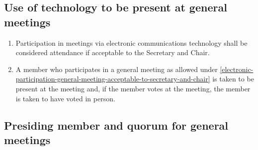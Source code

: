 \documentclass[../constitution.tex]{subfiles}
\begin{document}
\hypertarget{use-of-technology-to-be-present-at-general-meetings}{%
\subsection{Use of technology to be present at general meetings}\label{use-of-technology-to-be-present-at-general-meetings}}

\begin{enumerate}

\item Participation in meetings via electronic communications technology shall be considered attendance if acceptable to the Secretary and Chair. \label{electronic-participation-general-meeting-acceptable-to-secretary-and-chair} 
\item A member who participates in a general meeting as allowed under  \ref{electronic-participation-general-meeting-acceptable-to-secretary-and-chair} is taken to be present at the meeting and, if the member votes at the meeting, the member is taken to have voted in person.
\end{enumerate}

\hypertarget{presiding-member-and-quorum-for-general-meetings}{%
\subsection{Presiding member and quorum for general meetings}\label{presiding-member-and-quorum-for-general-meetings}}
\end{document}
